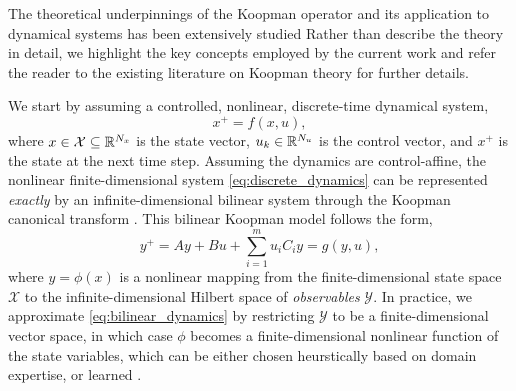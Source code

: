\documentclass[../root.tex]{subfiles}
\newcommand{\changed}[1]{{\color{black} #1}}
\begin{document}
The theoretical underpinnings of the Koopman operator and its application to dynamical
systems has been extensively studied 
\cite{fasel_SINDy_2021,proctor_Generalizing_2018,bruder_Advantages_2021,williams_Data_2015,surana_Koopman_2016} 
Rather than describe the theory in detail, we highlight the key concepts employed by the
current work and refer the reader to the existing literature on Koopman theory for further
details.

We start by assuming a controlled, nonlinear, discrete-time dynamical system,
\begin{equation} \label{eq:discrete_dynamics} 
  x^+ = f(x, u), 
\end{equation} 
where $x \in \mathcal{X} \subseteq \mathbb{R}^{N_x}$ is the state vector, $u_k \in \mathbb{R}^{N_u}$ is the
control vector, and $x^+$ is the state at the next time step. \changed{Assuming the dynamics
are control-affine, the nonlinear finite-dimensional system \eqref{eq:discrete_dynamics}
can be represented \emph{exactly} by an infinite-dimensional bilinear system through the
Koopman canonical transform \cite{Surana2016}. This bilinear Koopman model follows the form,}
\begin{equation} \label{eq:bilinear_dynamics}
  y^+ = A y + B u + \sum_{i=1}^m u_i C_i y = g(y,u) ,
\end{equation}
where $y = \phi(x)$ is a nonlinear mapping from the finite-dimensional state space
$\mathcal{X}$ to the infinite-dimensional Hilbert space of \textit{observables}
$\mathcal{Y}$.  In practice, we approximate \eqref{eq:bilinear_dynamics} by restricting
$\mathcal{Y}$ to be a finite-dimensional vector space, in which case $\phi$ becomes a
finite-dimensional nonlinear function of the state variables, \changed{which can be either chosen 
heurstically based on domain expertise, or learned
\cite{folkestad_Extended_2020,folkestad_KoopNet_2022,li_Extended_2017}}.
\end{document}

